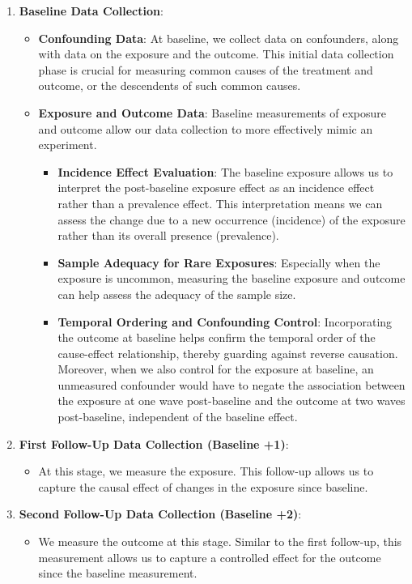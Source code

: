 \documentclass[
  singlecolumn]{article}
\providecommand{\tightlist}{%
  \setlength{\itemsep}{0pt}\setlength{\parskip}{0pt}}\usepackage{longtable,booktabs,array}
\begin{document}
\begin{enumerate}
\def\labelenumi{\arabic{enumi}.}
\item
  \textbf{Baseline Data Collection}:

  \begin{itemize}
  \item
    \textbf{Confounding Data}: At baseline, we collect data on
    confounders, along with data on the exposure and the outcome. This
    initial data collection phase is crucial for measuring common causes
    of the treatment and outcome, or the descendents of such common
    causes.
  \item
    \textbf{Exposure and Outcome Data}: Baseline measurements of
    exposure and outcome allow our data collection to more effectively
    mimic an experiment.

    \begin{itemize}
    \item
      \textbf{Incidence Effect Evaluation}: The baseline exposure allows
      us to interpret the post-baseline exposure effect as an incidence
      effect rather than a prevalence effect. This interpretation means
      we can assess the change due to a new occurrence (incidence) of
      the exposure rather than its overall presence (prevalence).
    \item
      \textbf{Sample Adequacy for Rare Exposures}: Especially when the
      exposure is uncommon, measuring the baseline exposure and outcome
      can help assess the adequacy of the sample size.
    \item
      \textbf{Temporal Ordering and Confounding Control}: Incorporating
      the outcome at baseline helps confirm the temporal order of the
      cause-effect relationship, thereby guarding against reverse
      causation. Moreover, when we also control for the exposure at
      baseline, an unmeasured confounder would have to negate the
      association between the exposure at one wave post-baseline and the
      outcome at two waves post-baseline, independent of the baseline
      effect.
    \end{itemize}
  \end{itemize}
\item
  \textbf{First Follow-Up Data Collection (Baseline +1)}:

  \begin{itemize}
  \tightlist
  \item
    At this stage, we measure the exposure. This follow-up allows us to
    capture the causal effect of changes in the exposure since baseline.
  \end{itemize}
\item
  \textbf{Second Follow-Up Data Collection (Baseline +2)}:

  \begin{itemize}
  \tightlist
  \item
    We measure the outcome at this stage. Similar to the first
    follow-up, this measurement allows us to capture a controlled effect
    for the outcome since the baseline measurement.
  \end{itemize}
\end{enumerate}
\end{document}
